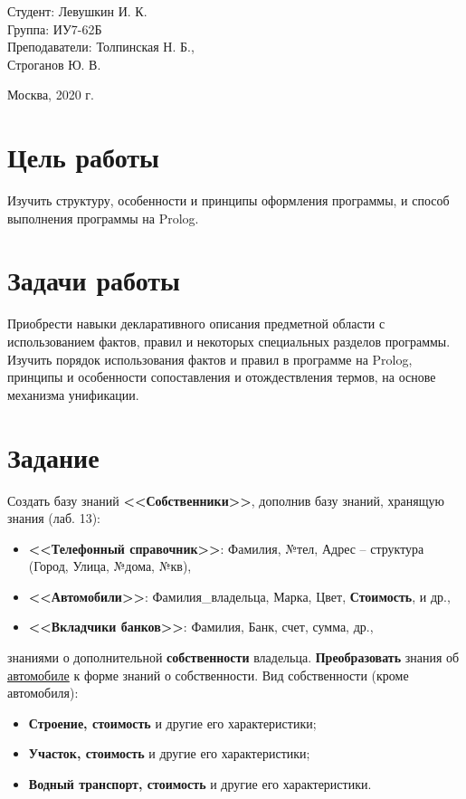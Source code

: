\documentclass[a4paper,12pt]{article}
\begin{document}
	\vspace*{15mm} 	
	
	\large
	\begin{flushright}
		Студент: Левушкин И. К. \\
		Группа: ИУ7-62Б \\
		Преподаватели: Толпинская Н. Б., \\ Строганов Ю. В. \\
	\end{flushright}
	
	\vspace*{30mm}
	\begin{center}
		Москва, 2020 г.  
	\end{center}
	\thispagestyle{empty}
	
	
	\newpage
	
	\section*{Цель работы}
	
	Изучить структуру, особенности и принципы оформления программы, и способ выполнения программы на Prolog.
	
	\section*{Задачи работы}
	
	Приобрести навыки декларативного описания предметной области с использованием фактов, правил и некоторых специальных разделов программы.
	Изучить порядок использования фактов и правил в программе на Prolog, принципы  и особенности сопоставления и отождествления термов, на основе механизма унификации.
	
	\section*{Задание}
	
	Создать базу знаний {\bf <<Собственники>>}, дополнив базу знаний, хранящую знания (лаб. 13):
	\begin{itemize}
		\item {\bf <<Телефонный справочник>>}: Фамилия, №тел, Адрес – структура (Город, Улица, №дома, №кв),
		\item {\bf <<Автомобили>>}: Фамилия\_владельца, Марка, Цвет, {\bf Стоимость}, и др.,
		\item {\bf <<Вкладчики банков>>}: Фамилия, Банк, счет, сумма, др.,
	\end{itemize}
	знаниями о дополнительной {\bf собственности} владельца. {\bf Преобразовать} знания об \underline{автомобиле} к форме знаний о собственности.
	Вид собственности (кроме автомобиля):
	\begin{itemize}
		\item {\bf Строение, стоимость} и другие его характеристики;
		\item {\bf Участок, стоимость} и другие его характеристики;
		\item {\bf Водный транспорт, стоимость} и другие его характеристики.
	\end{itemize}
	
\end{document}
